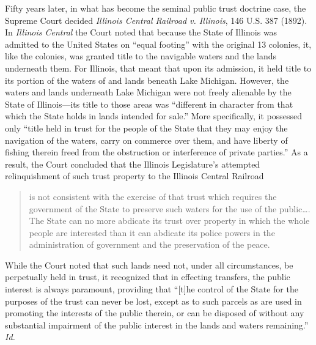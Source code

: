 Fifty years later, in what has become the seminal public trust doctrine case,
the Supreme Court decided \textit{Illinois Central Railroad v. Illinois},  146
U.S. 387 (1892). In \textit{Illinois Central} the Court noted that because the
State of Illinois was admitted to the United States on ``equal footing'' with
the original 13 colonies, it, like the colonies, was granted title to the
navigable waters and the lands underneath them. For Illinois, that meant that
upon its admission, it held title to its portion of the waters of and lands
beneath Lake Michigan. However, the waters and lands underneath Lake Michigan
were not freely alienable by the State of Illinois---its title to those areas
was ``different in character from that which the State holds in lands intended
for sale.'' More specifically, it possessed only ``title held in trust for the
people of the State that they may enjoy the navigation of the waters, carry on
commerce over them, and have liberty of fishing therein freed from the
obstruction or interference of private parties.'' As a result, the Court
concluded that the Illinois Legislature's attempted relinquishment of such trust
property to the Illinois Central Railroad
\begin{quote}
is not consistent with the exercise of that trust which requires the government
of the State to preserve such waters for the use of the public\ldots. The State
can no more abdicate its trust over property in which the whole people are
interested than it can abdicate its police powers in the administration of
government and the preservation of the peace.
\end{quote}

While the Court noted that such lands need not, under all circumstances, be
perpetually held in trust, it recognized that in effecting transfers, the public
interest is always paramount, providing that ``[t]he control of the State for
the purposes of the trust can never be lost, except as to such parcels as are
used in promoting the interests of the public therein, or can be disposed of
without any substantial impairment of the public interest in the lands and
waters remaining.'' \textit{Id.}

